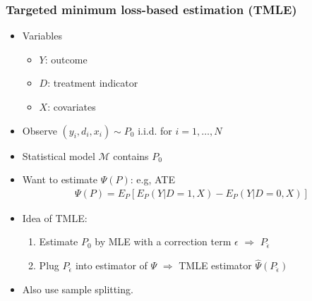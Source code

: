 \documentclass[aspectratio=169, 12pt]{beamer}
\begin{document}
	\begin{frame}
	\frametitle{Targeted minimum loss-based estimation (TMLE)}
	\begin{itemize}
	\item Variables
	\begin{itemize}
	\item $Y$: outcome
	\item $D$: treatment indicator
	\item $X$: covariates
	\end{itemize}
	\item Observe $(y_i,d_i,x_i) \sim P_0 $ i.i.d. for $i=1,\dots,N $
	\item Statistical model $\mathcal{M} $ contains $P_0 $
	\item Want to estimate $\Psi(P) $: e.g, ATE
	\begin{eqnarray*}
	\Psi(P) = E_P[E_P(Y|D=1,X) - E_P(Y|D=0,X)]
	\end{eqnarray*}
	\item Idea of TMLE:
	\begin{enumerate}
	\item Estimate $P_0$ by MLE with a correction term $\epsilon $ $\Rightarrow $ $P_{\hat{\epsilon}} $
	\item Plug $P_{\hat{\epsilon}} $ into estimator of $\Psi $ $\Rightarrow $ TMLE estimator $\hat{\Psi}(P_{\hat{\epsilon}}) $
	\end{enumerate}
	\item Also use sample splitting.
	\end{itemize}

	\end{frame}
\end{document}
